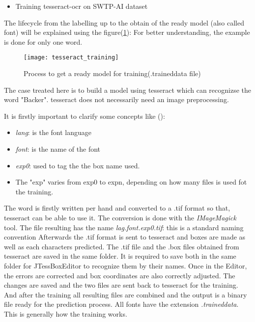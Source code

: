 \begin{itemize} \bfseries
	\item Training tesseract-ocr on SWTP-AI dataset 
\end{itemize}
The lifecycle from the labelling up to the obtain of the ready model (also called font) will be explained using the figure(\ref{Abb:tess_training}):
For better understanding, the example is done for only one word.

\begin{figure}[htb]
	\centering
	\texttt{[image: tesseract\_training]}
	\caption[From writting to trained data File]{Process to get a ready model for training(.traineddata file)} \label{Abb:tess_training}
\end{figure}

The case treated here is to build a model using tesseract which can recognizse the word "Backer". 
tesseract does not necessarily need an image preprocessing.

\noindent
It is firstly important to clarify some concepts like (\cite{[10]}): 
\begin{itemize}
    \item \emph{lang}: is the font language
    \item \emph{font}: is the name of the font
    \item \emph{exp0}: used to tag the the box name used. 
	\item The "exp" varies from exp0 to expn, depending on how many files is used fot the training.
\end{itemize}
The word is firstly written per hand and converted to a .tif format so that, tesseract can be able to use it. 
The conversion is done with the \emph{IMageMagick} tool. The file resulting has the name \emph{lag.font.exp0.tif}:
this is a standard naming convention
Afterwards the .tif format is sent to tesseract and boxes are made as well as each characters predicted. 
The .tif file and the .box files obtained from tesseract are saved in the same folder. 
It is required to save both in the same folder for JTessBoxEditor to recognize them by their names. 
Once in the Editor, the errors are corrected and box coordinates are also correctly adjusted. 
The changes are saved and the two files are sent back to tesseract for the training. 
And after the training all resulting files are combined and the output is a binary file ready  for the prediction process. 
All fonts have the extension \emph{.traineddata}.   
This is generally how the training works.  

\newpage


